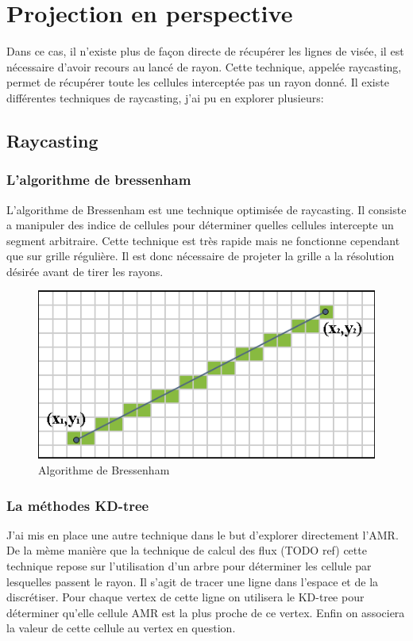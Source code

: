 \section{Projection en perspective}

Dans ce cas, il n'existe plus de façon directe de récupérer les lignes de visée, il est nécessaire d'avoir recours au lancé de rayon.
Cette technique, appelée raycasting, permet de récupérer toute les cellules interceptée pas un rayon donné.
Il existe différentes techniques de raycasting, j'ai pu en explorer plusieurs:

\subsection{Raycasting}
\subsubsection{L'algorithme de bressenham}
L'algorithme de Bressenham est une technique optimisée de raycasting.
Il consiste a manipuler des indice de cellules pour déterminer quelles cellules intercepte un segment arbitraire.
Cette technique est très rapide mais ne fonctionne cependant que sur grille régulière.
Il est donc nécessaire de projeter la grille a la résolution désirée avant de tirer les rayons.

\begin{figure}[bth]
        \includegraphics[width=.95\linewidth]{img/04/Bresenham_line.png} 
        \caption{Algorithme de Bressenham }
 		\label{fig:bressenham}
\end{figure}

\subsubsection{La méthodes KD-tree}

J'ai mis en place une autre technique dans le but d'explorer directement l'AMR.
De la mème manière que la technique de calcul des flux (TODO ref) cette technique repose sur l'utilisation d'un arbre pour déterminer les cellule par lesquelles passent le rayon.
Il s'agit de tracer une ligne dans l'espace et de la discrétiser.
Pour chaque vertex de cette ligne on utilisera le KD-tree pour déterminer qu'elle cellule AMR est la plus proche de ce vertex.
Enfin on associera la valeur de cette cellule au vertex en question.


